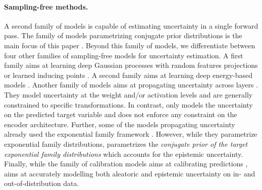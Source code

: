 \paragraph{Sampling-free methods.} A second family of models is capable of estimating uncertainty in a single forward pass. The family of models parametrizing conjugate prior distributions is the main focus of this paper \citep{survey_evidential_uncertainty,evaluating_dbu,max_gap_id_ood,uncertainty-generative-classifier,multifaceted_uncertainty,graph_posterior, lightweight-prob-net}. Beyond this family of models, we differentiate between four other families of sampling-free models for uncertainty estimation. A first family aims at learning deep Gaussian processes with random features projections or learned inducing points \citep{uncertainty-distance-awareness, due, duq, uceloss}. A second family aims at learning deep energy-based models \citep{ood_ebm, jem_ebm}. Another family of models aims at propagating uncertainty across layers \citep{natural-parameter-network, sampling-free-variance-propagation, feed-forward-propagation, lightweight-prob-net, probabilistic-backprop-scalable-bnn}. They model uncertainty at the weight and/or activation levels and are generally constrained to specific transformations. In contrast, \NatPNacro{} only models the uncertainty on the predicted target variable and does not enforce any constraint on the encoder architecture. Further, some of the models propagating uncertainty already used the exponential family framework \citep{natural-parameter-network, deep-exponential-families}. However, while they parametrize exponential family distributions, \NatPNacro{} parametrizes the \emph{conjugate prior of the target exponential family distributions} which accounts for the epistemic uncertainty. Finally, while the family of calibration models aims at calibrating predictions \citep{accurate-uncertainties-deep-learning-regression, confidence-aware-learning, individual-calibration, distribution-calibration-regression, intra-order-preserving}, \NatPNacro{} aims at accurately modelling both aleatoric and epistemic uncertainty on in- and out-of-distribution data.
